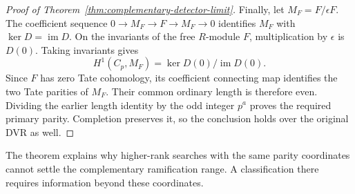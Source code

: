 \begin{proof}[Proof of Theorem~\ref{thm:complementary-detector-limit}]
Finally, let $M_F=F/\epsilon F$.  The coefficient sequence
$0\to M_F\to F\to M_F\to0$ identifies $M_F$ with
$\ker D=\operatorname{im}D$.  On the invariants of the free
$R$-module $F$, multiplication by $\epsilon$ is $D(0)$.
Taking invariants gives
\[
 H^1(C_p,M_F)=\ker D(0)/\operatorname{im}D(0).
\]
Since $F$ has zero Tate cohomology, its coefficient connecting map
identifies the two Tate parities of $M_F$.  Their common ordinary
length is therefore even.  Dividing the earlier length identity by
the odd integer $p^a$ proves the required primary parity.
Completion preserves it, so the conclusion holds over the original
DVR as well.
\end{proof}

The theorem explains why higher-rank searches with the same parity
coordinates cannot settle the complementary ramification range.
A classification there requires information beyond these coordinates.
